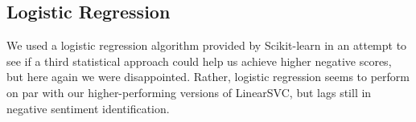 \subsection{Logistic Regression}
We used a logistic regression algorithm provided by Scikit-learn in an attempt to see if a third statistical approach could help us achieve higher negative scores, but here again we were disappointed. Rather, logistic regression seems to perform on par with our higher-performing versions of LinearSVC, but lags still in negative sentiment identification. 